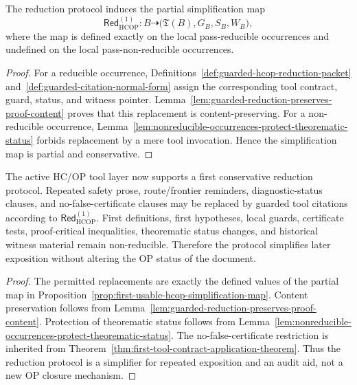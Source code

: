 \begin{proposition}
\label{prop:first-usable-hcop-simplification-map}
The reduction protocol induces the partial simplification map
\[
 \mathsf{Red}_{\mathrm{HCOP}}^{(1)}:
 B
 \dashrightarrow
 \bigl(\mathfrak T(B),G_B,S_B,W_B\bigr),
\]
where the map is defined exactly on the local pass-reducible occurrences and undefined on the local pass-non-reducible occurrences.
\end{proposition}

\begin{proof}
For a reducible occurrence, Definitions~\ref{def:guarded-hcop-reduction-packet} and~\ref{def:guarded-citation-normal-form} assign the corresponding tool contract, guard, status, and witness pointer. Lemma~\ref{lem:guarded-reduction-preserves-proof-content} proves that this replacement is content-preserving. For a non-reducible occurrence, Lemma~\ref{lem:nonreducible-occurrences-protect-theorematic-status} forbids replacement by a mere tool invocation. Hence the simplification map is partial and conservative.
\end{proof}

\begin{theorem}
\label{thm:first-tool-guarded-hcop-reduction-theorem}
The active HC/OP tool layer now supports a first conservative reduction protocol. Repeated safety prose, route/frontier reminders, diagnostic-status clauses, and no-false-certificate clauses may be replaced by guarded tool citations according to \(\mathsf{Red}_{\mathrm{HCOP}}^{(1)}\). First definitions, first hypotheses, local guards, certificate tests, proof-critical inequalities, theorematic status changes, and historical witness material remain non-reducible. Therefore the protocol simplifies later exposition without altering the OP status of the document.
\end{theorem}

\begin{proof}
The permitted replacements are exactly the defined values of the partial map in Proposition~\ref{prop:first-usable-hcop-simplification-map}. Content preservation follows from Lemma~\ref{lem:guarded-reduction-preserves-proof-content}. Protection of theorematic status follows from Lemma~\ref{lem:nonreducible-occurrences-protect-theorematic-status}. The no-false-certificate restriction is inherited from Theorem~\ref{thm:first-tool-contract-application-theorem}. Thus the reduction protocol is a simplifier for repeated exposition and an audit aid, not a new OP closure mechanism.
\end{proof}

